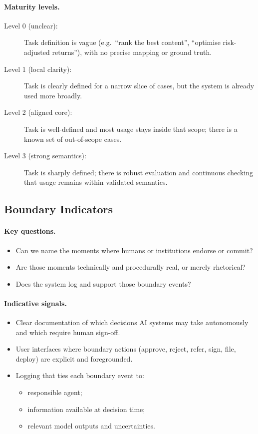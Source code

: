 \paragraph{Maturity levels.}

\begin{description}
  \item[Level 0 (unclear):]
    Task definition is vague
    (e.g.\ ``rank the best content'', ``optimise risk-adjusted
    returns''), with no precise mapping or ground truth.
  \item[Level 1 (local clarity):]
    Task is clearly defined for a narrow slice of cases, but the system
    is already used more broadly.
  \item[Level 2 (aligned core):]
    Task is well-defined and most usage stays inside that scope; there
    is a known set of out-of-scope cases.
  \item[Level 3 (strong semantics):]
    Task is sharply defined; there is robust evaluation and continuous
    checking that usage remains within validated semantics.
\end{description}

\subsection{Boundary Indicators}

\paragraph{Key questions.}

\begin{itemize}
  \item Can we name the moments where humans or institutions endorse
        or commit?
  \item Are those moments technically and procedurally real, or merely
        rhetorical?
  \item Does the system log and support those boundary events?
\end{itemize}

\paragraph{Indicative signals.}

\begin{itemize}
  \item Clear documentation of which decisions AI systems may take
        autonomously and which require human sign-off.
  \item User interfaces where boundary actions (approve, reject, refer,
        sign, file, deploy) are explicit and foregrounded.
  \item Logging that ties each boundary event to:
        \begin{itemize}
          \item responsible agent;
          \item information available at decision time;
          \item relevant model outputs and uncertainties.
        \end{itemize}
\end{itemize}

